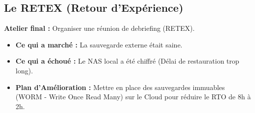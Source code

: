 \subsection{Le RETEX (Retour d'Expérience)}

\begin{boxlizbiz}
\textbf{Atelier final :} Organiser une réunion de debriefing (RETEX).
\begin{itemize}
    \item \textbf{Ce qui a marché :} La sauvegarde externe était saine.
    \item \textbf{Ce qui a échoué :} Le NAS local a été chiffré (Délai de restauration trop long).
    \item \textbf{Plan d'Amélioration :} Mettre en place des sauvegardes immuables (WORM - Write Once Read Many) sur le Cloud pour réduire le RTO de 8h à 2h.
\end{itemize}
\end{boxlizbiz}

